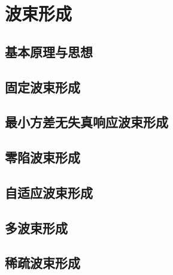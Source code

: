 \chapter{波束形成}

\section{基本原理与思想}

\section{固定波束形成}

\section{最小方差无失真响应波束形成}

\section{零陷波束形成}

\section{自适应波束形成}

\section{多波束形成}

\section{稀疏波束形成}
